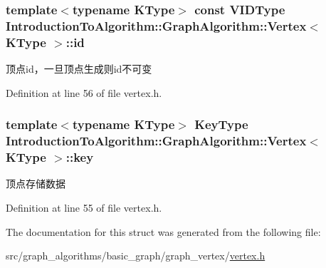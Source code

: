 \subsubsection[{id}]{\setlength{\rightskip}{0pt plus 5cm}template$<$typename K\+Type$>$ const {\bf V\+I\+D\+Type} {\bf Introduction\+To\+Algorithm\+::\+Graph\+Algorithm\+::\+Vertex}$<$ K\+Type $>$\+::id}\label{struct_introduction_to_algorithm_1_1_graph_algorithm_1_1_vertex_a76668b285452856d184a245b7b35b7c1}
顶点id，一旦顶点生成则id不可变 

Definition at line 56 of file vertex.\+h.

\hypertarget{struct_introduction_to_algorithm_1_1_graph_algorithm_1_1_vertex_a5bcfb4e0ba9450b8ebb2543069772d1f}{}
\subsubsection[{key}]{\setlength{\rightskip}{0pt plus 5cm}template$<$typename K\+Type$>$ {\bf Key\+Type} {\bf Introduction\+To\+Algorithm\+::\+Graph\+Algorithm\+::\+Vertex}$<$ K\+Type $>$\+::key}\label{struct_introduction_to_algorithm_1_1_graph_algorithm_1_1_vertex_a5bcfb4e0ba9450b8ebb2543069772d1f}
顶点存储数据 

Definition at line 55 of file vertex.\+h.



The documentation for this struct was generated from the following file\+:\begin{DoxyCompactItemize}
\item 
src/graph\+\_\+algorithms/basic\+\_\+graph/graph\+\_\+vertex/\hyperlink{vertex_8h}{vertex.\+h}\end{DoxyCompactItemize}
